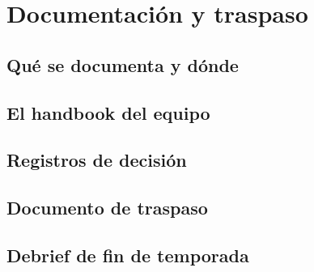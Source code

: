 \chapter{Documentación y traspaso}
\label{ch:documentacion_traspaso}

\begin{objetivos}
  \item {}
  \item {}
  \item {}
\end{objetivos}


\section{Qué se documenta y dónde}
\label{sec:documentacion_traspaso:01}

\section{El handbook del equipo}
\label{sec:documentacion_traspaso:02}

\section{Registros de decisión}
\label{sec:documentacion_traspaso:03}

\section{Documento de traspaso}
\label{sec:documentacion_traspaso:04}

\section{Debrief de fin de temporada}
\label{sec:documentacion_traspaso:05}


